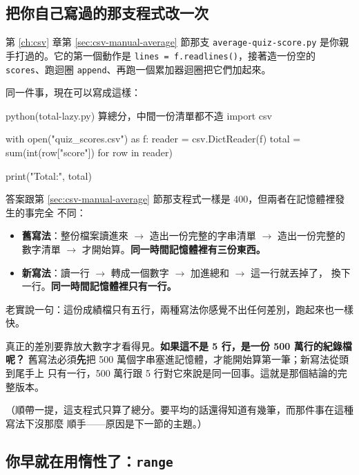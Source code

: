 \subsection*{把你自己寫過的那支程式改一次}

第 \ref{ch:csv} 章第 \ref{sec:csv-manual-average} 節那支 \texttt{average-quiz-score.py}
是你親手打過的。它的第一個動作是 \texttt{lines = f.readlines()}，接著造一份空的
\texttt{scores}、跑迴圈 \texttt{append}、再跑一個累加器迴圈把它們加起來。

同一件事，現在可以寫成這樣：

\begin{example}{python}{(total-lazy.py) 算總分，中間一份清單都不造}
import csv

with open("quiz_scores.csv") as f:
    reader = csv.DictReader(f)
    total = sum(int(row["score"]) for row in reader)

print("Total:", total)
\end{example}


答案跟第 \ref{sec:csv-manual-average} 節那支程式一樣是 400，但兩者在記憶體裡發生的事完全
不同：

\begin{itemize}
\item \textbf{舊寫法}：整份檔案讀進來 $\to$ 造出一份完整的字串清單 $\to$ 造出一份完整的
數字清單 $\to$ 才開始算。\textbf{同一時間記憶體裡有三份東西。}
\item \textbf{新寫法}：讀一行 $\to$ 轉成一個數字 $\to$ 加進總和 $\to$ 這一行就丟掉了，
換下一行。\textbf{同一時間記憶體裡只有一行。}
\end{itemize}

老實說一句：這份成績檔只有五行，兩種寫法你感覺不出任何差別，跑起來也一樣快。

真正的差別要靠放大數字才看得見。\textbf{如果這不是 5 行，是一份 500 萬行的紀錄檔呢？}
舊寫法必須\textbf{先}把 500 萬個字串塞進記憶體，才能開始算第一筆；新寫法從頭到尾手上
只有一行，500 萬行跟 5 行對它來說是同一回事。這就是那個結論的完整版本。

（順帶一提，這支程式只算了總分。要平均的話還得知道有幾筆，而那件事在這種寫法下沒那麼
順手——原因是下一節的主題。）

\subsection*{你早就在用惰性了：\texttt{range}}

